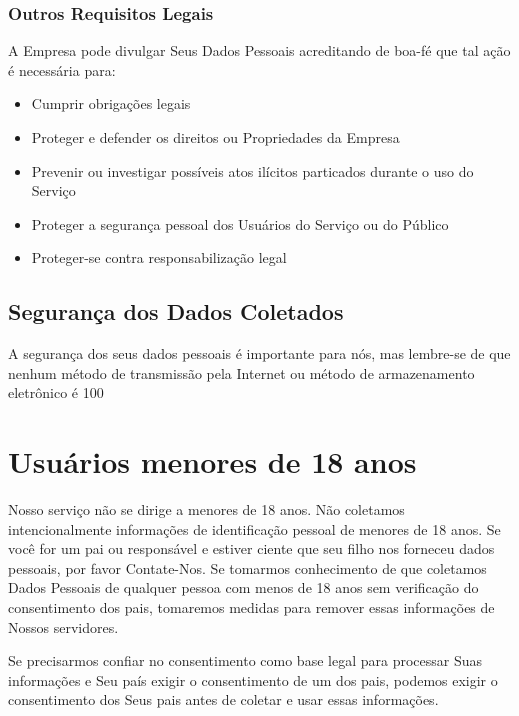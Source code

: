 \subsubsection{Outros Requisitos Legais}

A Empresa pode divulgar Seus Dados Pessoais acreditando de boa-fé que tal ação é necessária para:

\begin{itemize}
	\item Cumprir obrigações legais
	\item Proteger e defender os direitos ou Propriedades da Empresa
	\item Prevenir ou investigar possíveis atos ilícitos particados durante o uso do Serviço
	\item Proteger a segurança pessoal dos Usuários do Serviço ou do Público
	\item Proteger-se contra responsabilização legal
\end{itemize}

\subsection{Segurança dos Dados Coletados}

A segurança dos seus dados pessoais é importante para nós, mas lembre-se de que nenhum método de transmissão pela Internet ou método de armazenamento eletrônico é 100%

\section{Usuários menores de 18 anos}

Nosso serviço não se dirige a menores de 18 anos. Não coletamos intencionalmente informações de identificação pessoal de menores de 18 anos. Se você for um pai ou responsável e estiver ciente que seu filho nos forneceu dados pessoais, por favor Contate-Nos. Se tomarmos conhecimento de que coletamos Dados Pessoais de qualquer pessoa com menos de 18 anos sem verificação do consentimento dos pais, tomaremos medidas para remover essas informações de Nossos servidores.

Se precisarmos confiar no consentimento como base legal para processar Suas informações e Seu país exigir o consentimento de um dos pais, podemos exigir o consentimento dos Seus pais antes de coletar e usar essas informações.

